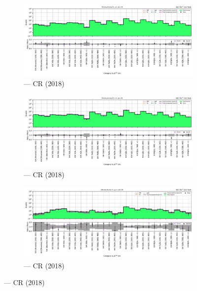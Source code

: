 \begin{figure}[htbp]
    \centering
    \begin{subfigure}[b]{0.65\textwidth}
        \includegraphics[width=\textwidth]{chapters/higgstoinv/figures/mountain_ranges/2018/ttH/Wmunu_tree_fit_b-abs_values_ttH_cats.pdf}
        \caption{\ttH --- \singleMuCr \gls{CR} (2018)}
    \end{subfigure}

    \begin{subfigure}[b]{0.65\textwidth}
        \includegraphics[width=\textwidth]{chapters/higgstoinv/figures/mountain_ranges/2018/ttH/Wenu_tree_fit_b-abs_values_ttH_cats.pdf}
        \caption{\ttH --- \singleEleCr \gls{CR} (2018)}
    \end{subfigure}

    \begin{subfigure}[b]{0.65\textwidth}
        \includegraphics[width=\textwidth]{chapters/higgstoinv/figures/mountain_ranges/2018/ttH/Zmumu_tree_fit_b-abs_values_ttH_cats.pdf}
        \caption{\ttH --- \doubleMuCr \gls{CR} (2018)}
    \end{subfigure}


\end{figure}
